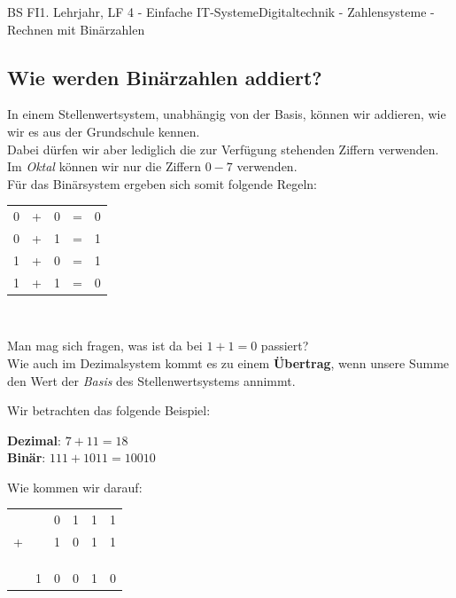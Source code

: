 \documentclass[11pt,twocolumn,oneside,openany,headings=optiontotoc,11pt,numbers=noenddot]{article}
\begin{document}
\begin{worksheet}{BS FI}{1. Lehrjahr, LF 4 - Einfache IT-Systeme}{Digitaltechnik - Zahlensysteme - Rechnen mit Binärzahlen}
		\subsection*{Wie werden Binärzahlen addiert?}
		In einem Stellenwertsystem, unabhängig von der Basis, können wir addieren, wie wir es aus der Grundschule kennen.\\
		Dabei dürfen wir aber lediglich die zur Verfügung stehenden Ziffern verwenden.\\
		\tiny{Im \textit{Oktal} können wir nur die Ziffern \(0 - 7\) verwenden.}\normalsize\\
		Für das Binärsystem ergeben sich somit folgende Regeln:\\
		\par\noindent
		\begin{tabularx}{0.48\textwidth}{ccccc}
			0 & + & 0 & = & 0\\
			0 & + & 1 & = & 1\\
			1 & + & 0 & = & 1\\
			1 & + & 1 & = & 0
		\end{tabularx}\\
		\par\noindent
		Man mag sich fragen, was ist da bei \(1 + 1 = 0\) passiert?\\
		Wie auch im Dezimalsystem kommt es zu einem \textbf{Übertrag}, wenn unsere Summe den Wert der \textit{Basis} des Stellenwertsystems annimmt.\\
		\begin{framed}
			\noindent
			Wir betrachten das folgende Beispiel:\\
			\par\noindent
			\textbf{Dezimal}: \(7 + 11 = 18\)\\
			\textbf{Binär}: \( 111 + 1011 = 10010\)\\
			\par\noindent
			Wie kommen wir darauf:\\
			\par\noindent
			\begin{tabularx}{0.4\textwidth}{llllll}
				& & 0 & 1 & 1 & 1\\
				+ & & 1 & 0 & 1 & 1\\
				\\
				\tiny{\color{codegray}{Übertrag}} & \color{codegray}{1} & \color{codegray}{1} & \color{codegray}{1} & \color{codegray}{1} & \\
				\cline{1-6}
				\\
				& 1 & 0 & 0 & 1 & 0\\

\end{tabularx}
\end{framed}
\end{worksheet}
\end{document}
